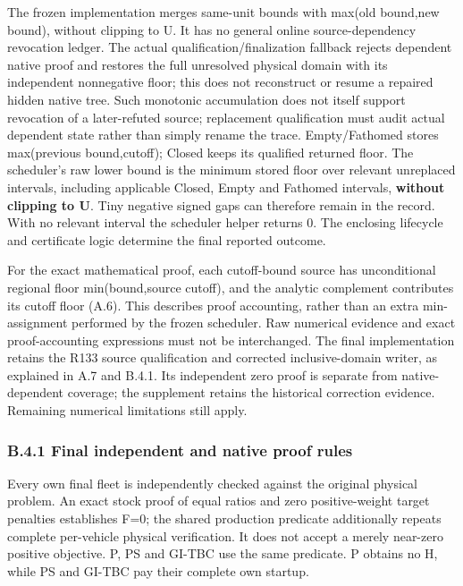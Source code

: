 \documentclass[
  american,
  11pt,
]{article}
\begin{document}
The frozen implementation merges same-unit bounds with max(old bound,new
bound), without clipping to U. It has no general online
source-dependency revocation ledger. The actual
qualification/finalization fallback rejects dependent native proof and
restores the full unresolved physical domain with its independent
nonnegative floor; this does not reconstruct or resume a repaired hidden
native tree. Such monotonic accumulation does not itself support
revocation of a later-refuted source; replacement qualification must
audit actual dependent state rather than simply rename the trace.
Empty/Fathomed stores max(previous bound,cutoff); Closed keeps its
qualified returned floor. The scheduler's raw lower bound is the minimum
stored floor over relevant unreplaced intervals, including applicable
Closed, Empty and Fathomed intervals, \textbf{without clipping to U}.
Tiny negative signed gaps can therefore remain in the record. With no
relevant interval the scheduler helper returns 0. The enclosing
lifecycle and certificate logic determine the final reported outcome.

For the exact mathematical proof, each cutoff-bound source has
unconditional regional floor min(bound,source cutoff), and the analytic
complement contributes its cutoff floor (A.6). This describes proof
accounting, rather than an extra min-assignment performed by the frozen
scheduler. Raw numerical evidence and exact proof-accounting expressions
must not be interchanged. The final implementation retains the R133
source qualification and corrected inclusive-domain writer, as explained
in A.7 and B.4.1. Its independent zero proof is separate from
native-dependent coverage; the supplement retains the historical
correction evidence. Remaining numerical limitations still apply.

\subsubsection{B.4.1 Final independent and native proof
rules}\label{b.4.1-final-independent-and-native-proof-rules}

Every own final fleet is independently checked against the original
physical problem. An exact stock proof of equal ratios and zero
positive-weight target penalties establishes F=0; the shared production
predicate additionally repeats complete per-vehicle physical
verification. It does not accept a merely near-zero positive objective.
P, PS and GI-TBC use the same predicate. P obtains no H, while PS and
GI-TBC pay their complete own startup.
\end{document}
